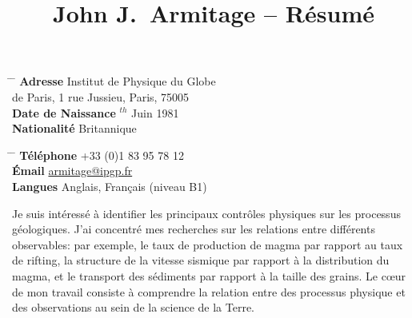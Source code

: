 \documentclass[hidelinks,10pt]{article} %
\begin{document}

\title{John J.~Armitage -- Résumé} %


\parbox{0.5\textwidth}{ %
\begin{tabbing} %
\hspace{3cm} \= \hspace{4cm} \= \kill %
{\bf Adresse} \> Institut de Physique du Globe \\ %
\> de Paris, 1 rue Jussieu, Paris, 75005 \\ %
{\bf Date de Naissance} $^{th}$ Juin 1981 \\ %
{\bf Nationalité} \> Britannique %
\end{tabbing}}
\hfill %
\parbox{0.5\textwidth}{ %
\begin{tabbing} %
\hspace{3cm} \= \hspace{4cm} \= \kill %
{\bf Téléphone} \> +33 (0)1 83 95 78 12  \\ %
{\bf Émail} \> \href{mailto:armitage@ipgp.fr}{armitage@ipgp.fr} \\ %
{\bf Langues} \> Anglais, Français (niveau B1) \\
\end{tabbing}}

%
%
Je suis intéressé à identifier les principaux contrôles physiques sur les processus géologiques. J'ai concentré mes recherches sur les relations entre différents observables: par exemple, le taux de production de magma par rapport au taux de rifting, la structure de la vitesse sismique par rapport à la distribution du magma, et le transport des sédiments par rapport à la taille des grains. Le cœur de mon travail consiste à comprendre la relation entre des processus physique et des observations au sein de la science de la Terre.
%
\end{document}
